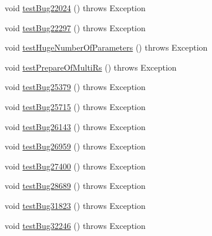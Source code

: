 \begin{DoxyCompactItemize}
\item 
void \mbox{\hyperlink{classtestsuite_1_1regression_1_1_callable_statement_regression_test_a32068ab38e449a082792fc6fcd779fb3}{test\+Bug22024}} ()  throws Exception 
\item 
void \mbox{\hyperlink{classtestsuite_1_1regression_1_1_callable_statement_regression_test_a601d825ec8a6e6d2a5e2d3141e9355b4}{test\+Bug22297}} ()  throws Exception 
\item 
void \mbox{\hyperlink{classtestsuite_1_1regression_1_1_callable_statement_regression_test_af2d71c7927c0532faaec78a0d07f1646}{test\+Huge\+Number\+Of\+Parameters}} ()  throws Exception 
\item 
void \mbox{\hyperlink{classtestsuite_1_1regression_1_1_callable_statement_regression_test_aae08f07ea8a89cbb94d2b62326904991}{test\+Prepare\+Of\+Multi\+Rs}} ()  throws Exception 
\item 
void \mbox{\hyperlink{classtestsuite_1_1regression_1_1_callable_statement_regression_test_a8603b59f7d522506f151fce4db9e7fe7}{test\+Bug25379}} ()  throws Exception 
\item 
void \mbox{\hyperlink{classtestsuite_1_1regression_1_1_callable_statement_regression_test_af26c483761c1cc584287d8a35c4f82db}{test\+Bug25715}} ()  throws Exception 
\item 
void \mbox{\hyperlink{classtestsuite_1_1regression_1_1_callable_statement_regression_test_acef13cfb17782dc6d9bc0aa4a289214f}{test\+Bug26143}} ()  throws Exception 
\item 
void \mbox{\hyperlink{classtestsuite_1_1regression_1_1_callable_statement_regression_test_a5184b94848dc877dcda10b8a55c6979f}{test\+Bug26959}} ()  throws Exception 
\item 
void \mbox{\hyperlink{classtestsuite_1_1regression_1_1_callable_statement_regression_test_a7980f197d22b9ff9cb6bcd2efe5848a6}{test\+Bug27400}} ()  throws Exception 
\item 
void \mbox{\hyperlink{classtestsuite_1_1regression_1_1_callable_statement_regression_test_ad52f0f9cf573c237f9b51732bcb429e8}{test\+Bug28689}} ()  throws Exception 
\item 
void \mbox{\hyperlink{classtestsuite_1_1regression_1_1_callable_statement_regression_test_a28a91e6259cced18e90ef08947170c38}{test\+Bug31823}} ()  throws Exception 
\item 
void \mbox{\hyperlink{classtestsuite_1_1regression_1_1_callable_statement_regression_test_ae409019fbd71b0dbfac43b3a30ed326e}{test\+Bug32246}} ()  throws Exception 
\item 

\end{DoxyCompactItemize}

